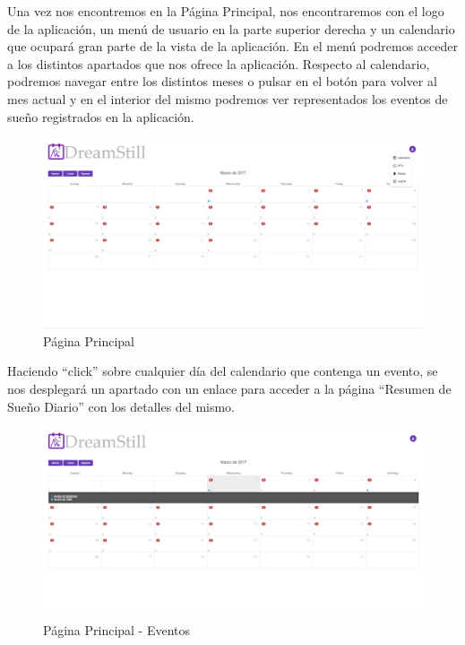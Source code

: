 \documentclass[11pt,openany]{book}
\begin{document}
Una vez nos encontremos en la Página Principal, nos encontraremos con el logo de la aplicación, un menú de usuario en la parte superior derecha y un calendario que ocupará gran parte de la vista de la aplicación. En el menú podremos acceder a los distintos apartados que nos ofrece la aplicación. Respecto al calendario, podremos navegar entre los distintos meses o pulsar en el botón para volver al mes actual y en el interior del mismo podremos ver representados los eventos de sueño registrados en la aplicación. 

\begin{figure}[H]
\centering
\includegraphics[totalheight=6cm]{manualUsuario/paginaPrincipal.png}
\caption{Página Principal}
\end{figure}

Haciendo ``click'' sobre cualquier día del calendario que contenga un evento, se nos desplegará un apartado con un enlace para acceder a la página ``Resumen de Sueño Diario'' con los detalles del mismo.

\begin{figure}[H]
\centering
\includegraphics[totalheight=6cm]{manualUsuario/eventos.png}
\caption{Página Principal - Eventos}
\end{figure}
\end{document}
